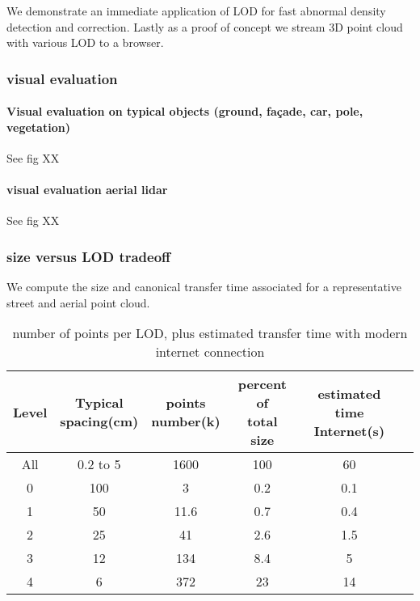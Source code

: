 			We demonstrate an immediate application of LOD for fast abnormal density detection and correction.
			Lastly as a proof of concept we stream 3D point cloud with various LOD to a browser.
		
		\subsubsection{visual evaluation}
			\paragraph{Visual evaluation on typical objects (ground, façade, car, pole, vegetation)}
				See fig XX 
			
			\paragraph{visual evaluation aerial lidar}			
				See fig XX 
		
		\subsubsection{size versus LOD tradeoff}
			We compute the size and canonical transfer time associated for a representative street and aerial point cloud.
			 	 
			 \begin{table}[ht]
				\centering
				\caption{ number of points per LOD, plus estimated transfer time with modern internet connection}
				\scriptsize 
				\begin{tabular}{|c|c|c|c|c|c}
				\hline Level & \shortstack{Typical \\ spacing(cm)} & \shortstack{ points \\ number(k)} & \shortstack{percent of \\ total size} & \shortstack{estimated \\ time Internet(s)}   \\
				\hline All & 0.2 to 5  & 1600 & 100 & 60 \\ 
				\hline 0 & 100 & 3 & 0.2 & 0.1 \\ 
				\hline 1 & 50 & 11.6 & 0.7 & 0.4 \\ 
				\hline 2 & 25 & 41 & 2.6 & 1.5 \\ 
				\hline 3 & 12 & 134 & 8.4 & 5 \\ 
				\hline 4 & 6 & 372 & 23 & 14 \\  
				
				\hline 
				\end{tabular} 
			\end{table}
			 

